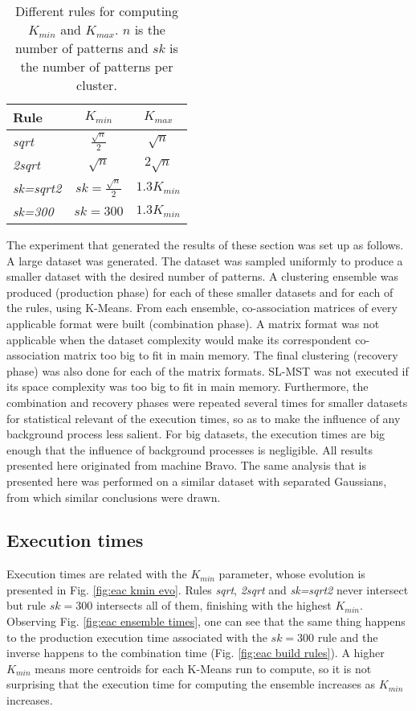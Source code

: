 \begin{table}[h]
\centering
\caption{Different rules for computing $K_{min}$ and $K_{max}$. $n$ is the number of patterns and $sk$ is the number of patterns per cluster.}

\begin{tabular}{lcc}
\toprule
Rule &  $K_{min}$ &  $K_{max}$ \\
\midrule
\emph{sqrt}     & $\frac{\sqrt{n}}{2}$      & $\sqrt{n}$    \\
\emph{2sqrt}    & $\sqrt{n}$                & $2 \sqrt{n}$  \\
\emph{sk=sqrt2} & $sk = \frac{\sqrt{n}}{2}$ & $1.3 K_{min}$ \\
\emph{sk=300}   & $sk = 300$                & $1.3 K_{min}$ \\
\bottomrule
\end{tabular}

\label{tab:eac rules}
\end{table}


The experiment that generated the results of these section was set up as follows.
A large dataset was generated.
The dataset was sampled uniformly to produce a smaller dataset with the desired number of patterns.
A clustering ensemble was produced (production phase) for each of these smaller datasets and for each of the rules, using K-Means.
From each ensemble, co-association matrices of every applicable format were built (combination phase).
A matrix format was not applicable when the dataset complexity would make its correspondent co-association matrix too big to fit in main memory.
The final clustering (recovery phase) was also done for each of the matrix formats.
SL-MST was not executed if its space complexity was too big to fit in main memory.
Furthermore, the combination and recovery phases were repeated several times for smaller datasets for statistical relevant of the execution times, so as to make the influence of any background process less salient.
For big datasets, the execution times are big enough that the influence of background processes is negligible.
All results presented here originated from machine Bravo.
The same analysis that is presented here was performed on a similar dataset with separated Gaussians, from which similar conclusions were drawn.

\subsection{Execution times}

Execution times are related with the $K_{min}$ parameter, whose evolution is presented in Fig. \ref{fig:eac kmin evo}.
Rules \emph{sqrt}, \emph{2sqrt} and \emph{sk=sqrt2} never intersect but rule $sk=300$ intersects all of them, finishing with the highest $K_{min}$.
Observing Fig. \ref{fig:eac ensemble times}, one can see that the same thing happens to the production execution time associated with the $sk=300$ rule and the inverse happens to the combination time (Fig. \ref{fig:eac build rules}).
A higher $K_{min}$ means more centroids for each K-Means run to compute, so it is not surprising that the execution time for computing the ensemble increases as $K_{min}$ increases.

